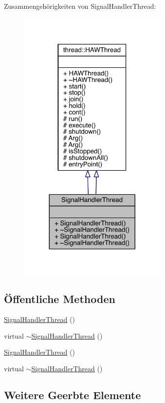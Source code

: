 Zusammengehörigkeiten von Signal\+Handler\+Thread\+:\nopagebreak
\begin{figure}[H]
\begin{center}
\leavevmode
\includegraphics[width=212pt]{class_signal_handler_thread__coll__graph}
\end{center}
\end{figure}
\subsection*{Öffentliche Methoden}
\begin{DoxyCompactItemize}
\item 
\hyperlink{class_signal_handler_thread_ab78029caf852fcaa1d4c1d22ae1432fd}{Signal\+Handler\+Thread} ()
\item 
virtual \hyperlink{class_signal_handler_thread_a414c6ca3b03db6f0fa9bf24957421bf4}{$\sim$\+Signal\+Handler\+Thread} ()
\item 
\hyperlink{class_signal_handler_thread_ab78029caf852fcaa1d4c1d22ae1432fd}{Signal\+Handler\+Thread} ()
\item 
virtual \hyperlink{class_signal_handler_thread_ae5f82b0b55704aba1cbf0e06002b2737}{$\sim$\+Signal\+Handler\+Thread} ()
\end{DoxyCompactItemize}
\subsection*{Weitere Geerbte Elemente}


